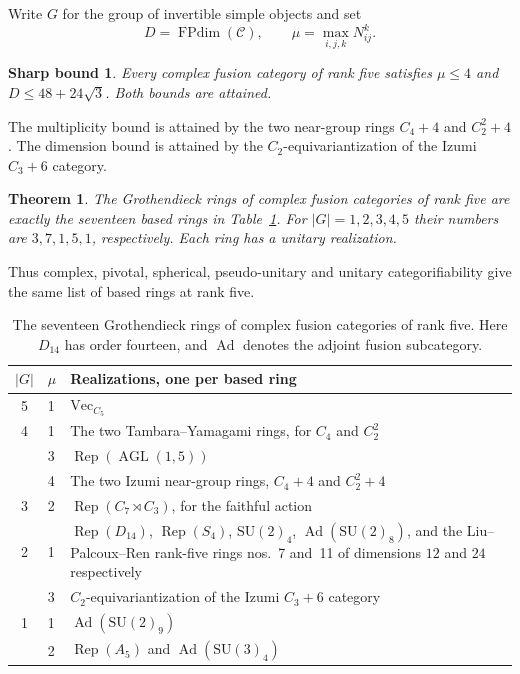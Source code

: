 \documentclass[11pt,a4paper]{article}
\newtheorem{classification}{Theorem}
\newtheorem*{sharpbounds}{Sharp bound}
\numberwithin{equation}{section}
\begin{document}
Write $G$ for the group of invertible simple objects and set
\[
 D=\operatorname{FPdim}(\mathcal C),\qquad
 \mu=\max_{i,j,k}N_{ij}^k.
\]
\begin{sharpbounds}
Every complex fusion category of rank five satisfies
$\mu\le4$ and $D\le48+24\sqrt3$. Both bounds are attained.
\end{sharpbounds}
The multiplicity bound is attained by the two near-group rings
$C_4+4$ and $C_2^2+4$. The dimension bound is attained by the
$C_2$-equivariantization of the Izumi $C_3+6$ category.
\begin{classification}\label{thm:main-classification}
The Grothendieck rings of complex fusion categories of rank five are
exactly the seventeen based rings in Table~\ref{tab:models-five}.
For $|G|=1,2,3,4,5$ their numbers are $3,7,1,5,1$, respectively.
Each ring has a unitary realization.
\end{classification}
Thus complex, pivotal, spherical, pseudo-unitary and unitary
categorifiability give the same list of based rings at rank five.

\begin{table}[ht]\centering\small
\begin{tabular}{@{}clp{.64\linewidth}@{}}\toprule
$|G|$ & $\mu$ & Realizations, one per based ring\\\midrule
5&1&$\mathrm{Vec}_{C_5}$\\
4&1&The two Tambara--Yamagami rings, for $C_4$ and $C_2^2$\\
 &3&$\operatorname{Rep}(\operatorname{AGL}(1,5))$\\
 &4&The two Izumi near-group rings, $C_4+4$ and $C_2^2+4$\\
3&2&$\operatorname{Rep}(C_7\rtimes C_3)$, for the faithful action\\
2&1&$\operatorname{Rep}(D_{14})$, $\operatorname{Rep}(S_4)$, $\mathrm{SU}(2)_4$, $\operatorname{Ad}(\mathrm{SU}(2)_8)$, and the Liu--Palcoux--Ren rank-five rings nos.~7 and~11 of dimensions $12$ and $24$ respectively \cite[\S3.5]{LPR}\\
 &3&$C_2$-equivariantization of the Izumi $C_3+6$ category\\
1&1&$\operatorname{Ad}(\mathrm{SU}(2)_9)$\\
 &2&$\operatorname{Rep}(A_5)$ and $\operatorname{Ad}(\mathrm{SU}(3)_4)$\\\bottomrule
\end{tabular}
\caption{The seventeen Grothendieck rings of complex fusion categories of rank five. Here $D_{14}$ has order fourteen, and $\operatorname{Ad}$ denotes the adjoint fusion subcategory.}
\label{tab:models-five}
\end{table}
\end{document}
